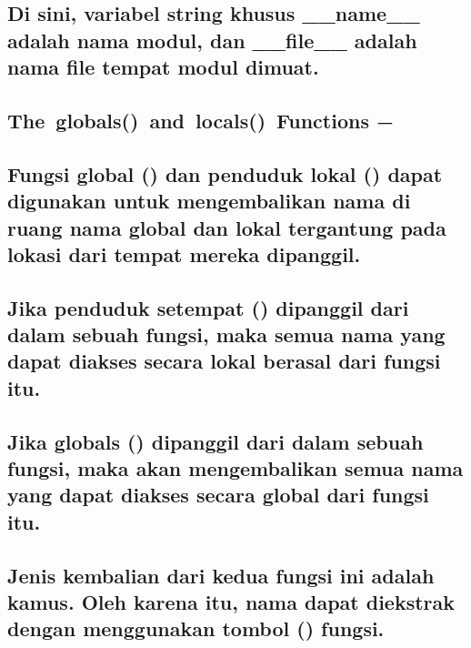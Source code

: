 \documentclass[a4paper,12pt]{report}
\begin{document}
\subsection*{Di sini, variabel string khusus __name__ adalah nama modul, dan __file__ adalah nama file tempat modul dimuat.}
 \par
\vspace{12pt}
\subsection*{The globals() and locals() Functions −}
 \par
\subsection*{Fungsi global () dan penduduk lokal () dapat digunakan untuk mengembalikan nama di ruang nama global dan lokal tergantung pada lokasi dari tempat mereka dipanggil.}
 \par
\subsection*{Jika penduduk setempat () dipanggil dari dalam sebuah fungsi, maka semua nama yang dapat diakses secara lokal berasal dari fungsi itu.}
 \par
\subsection*{Jika globals () dipanggil dari dalam sebuah fungsi, maka akan mengembalikan semua nama yang dapat diakses secara global dari fungsi itu.}
 \par
\subsection*{Jenis kembalian dari kedua fungsi ini adalah kamus. Oleh karena itu, nama dapat diekstrak dengan menggunakan tombol () fungsi.}
 \par
\vspace{12pt}
\end{document}

